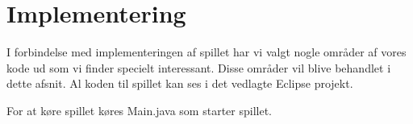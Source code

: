 \chapter{Implementering}\label{chap:implementering}
I forbindelse med implementeringen af spillet har vi valgt nogle områder af vores kode ud som vi finder specielt interessant. Disse områder vil blive behandlet i dette afsnit. Al koden til spillet kan ses i det vedlagte Eclipse projekt.

For at køre spillet køres Main.java som starter spillet.